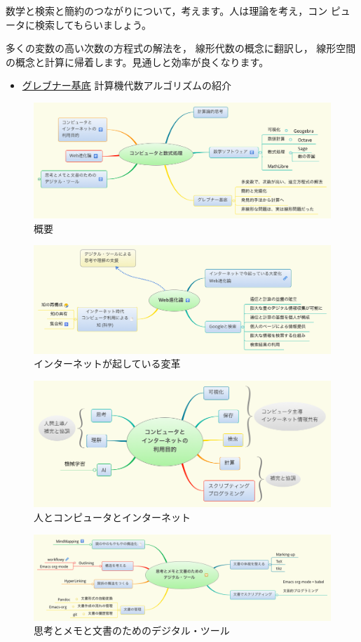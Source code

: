 \documentclass[dvipdfmx,11pt]{jarticle}
\begin{document}
数学と検索と簡約のつながりについて，考えます。人は理論を考え，コン
ピュータに検索してもらいましょう。

多くの変数の高い次数の方程式の解法を，
線形代数の概念に翻訳し，
線形空間の概念と計算に帰着します。見通しと効率が良くなります。

\begin{itemize}
\item \href{./org/groebner.org}{グレブナー基底} 計算機代数アルゴリズムの紹介
\end{itemize}

\begin{figure}[htbp]
\centering
\includegraphics[width=14cm]{./map-images/01-computer_and_cal.png}
\caption{概要}
\end{figure}

\begin{figure}[htbp]
\centering
\includegraphics[width=14cm]{./map-images/04-Web_revolution.png}
\caption{インターネットが起している変革}
\end{figure}

\begin{figure}[htbp]
\centering
\includegraphics[width=14cm]{./map-images/03-how_to_use_computer_and_internet.png}
\caption{人とコンピュータとインターネット}
\end{figure}

\begin{figure}[htbp]
\centering
\includegraphics[width=14cm]{./map-images/05-digital_tools_for_thinking.png}
\caption{思考とメモと文書のためのデジタル・ツール}
\end{figure}
\end{document}
